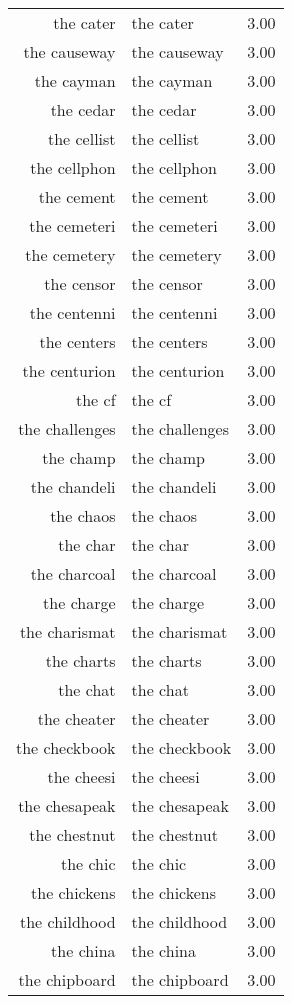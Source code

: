 \begin{table}[ht]
\begin{tabular}{rlr}
  the cater & the cater & 3.00 \\ 
  the causeway & the causeway & 3.00 \\ 
  the cayman & the cayman & 3.00 \\ 
  the cedar & the cedar & 3.00 \\ 
  the cellist & the cellist & 3.00 \\ 
  the cellphon & the cellphon & 3.00 \\ 
  the cement & the cement & 3.00 \\ 
  the cemeteri & the cemeteri & 3.00 \\ 
  the cemetery & the cemetery & 3.00 \\ 
  the censor & the censor & 3.00 \\ 
  the centenni & the centenni & 3.00 \\ 
  the centers & the centers & 3.00 \\ 
  the centurion & the centurion & 3.00 \\ 
  the cf & the cf & 3.00 \\ 
  the challenges & the challenges & 3.00 \\ 
  the champ & the champ & 3.00 \\ 
  the chandeli & the chandeli & 3.00 \\ 
  the chaos & the chaos & 3.00 \\ 
  the char & the char & 3.00 \\ 
  the charcoal & the charcoal & 3.00 \\ 
  the charge & the charge & 3.00 \\ 
  the charismat & the charismat & 3.00 \\ 
  the charts & the charts & 3.00 \\ 
  the chat & the chat & 3.00 \\ 
  the cheater & the cheater & 3.00 \\ 
  the checkbook & the checkbook & 3.00 \\ 
  the cheesi & the cheesi & 3.00 \\ 
  the chesapeak & the chesapeak & 3.00 \\ 
  the chestnut & the chestnut & 3.00 \\ 
  the chic & the chic & 3.00 \\ 
  the chickens & the chickens & 3.00 \\ 
  the childhood & the childhood & 3.00 \\ 
  the china & the china & 3.00 \\ 
  the chipboard & the chipboard & 3.00 \\ 

\end{tabular}
\end{table}
